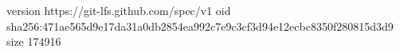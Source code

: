 version https://git-lfs.github.com/spec/v1
oid sha256:471ae565d9e17da31a0db2854ea992c7e9c3cf3d94e12ecbc8350f280815d3d9
size 174916
